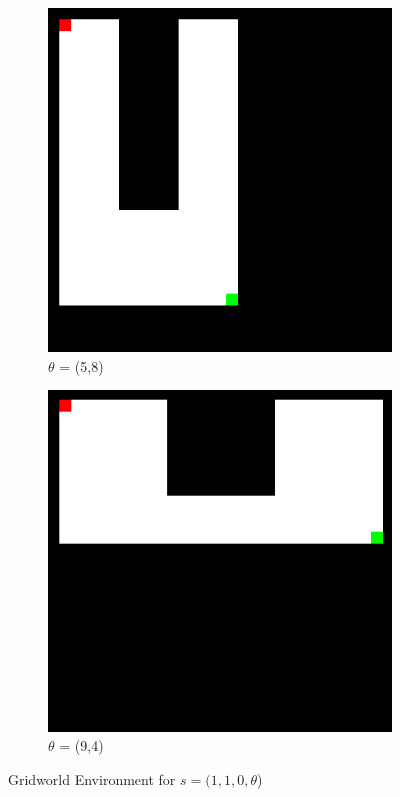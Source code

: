 \begin{figure}[H]
    \centering
    \begin{subfigure}{0.45\textwidth}
        \centering
        \includegraphics[width=0.75\linewidth]{images/gridworld_5x8.png}
        \caption{$\theta$ = (5,8)}
    \end{subfigure}
    \hfill
    \begin{subfigure}{0.45\textwidth}
        \centering
        \includegraphics[width=0.75\linewidth]{images/gridworld_9x4.png.png}
        \caption{$\theta$ = (9,4)}
    \end{subfigure}
    \caption{Gridworld Environment for $s = (1,1,0,\theta$)}
    \label{fig:gridworld}
\end{figure}

